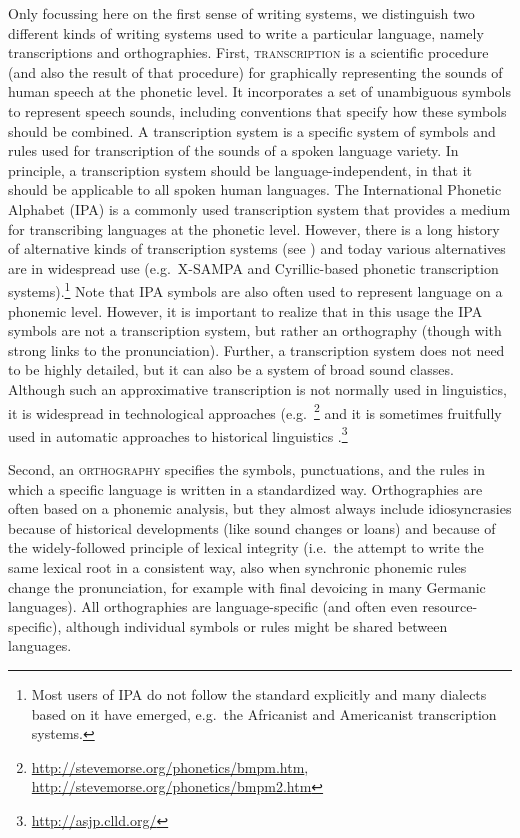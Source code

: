 Only focussing here on the first sense of writing systems, we distinguish two different kinds of writing systems used to write a particular language, namely transcriptions and orthographies. First, \textsc{transcription} is a scientific procedure (and also the result of that procedure) for graphically representing the sounds of human speech at the phonetic level. It incorporates a set of unambiguous symbols to represent speech sounds, including conventions that specify how these symbols should be combined. A transcription system is a specific system of symbols and rules used for transcription of the sounds of a spoken language variety. In principle, a transcription system should be language-independent, in that it should be applicable to all spoken human languages. The International Phonetic Alphabet (IPA) is a commonly used transcription system that provides a medium for transcribing languages at the phonetic level. However, there is a long history of alternative kinds of transcription systems (see \citet{Kemp1994}) and today various alternatives are in widespread use (e.g.~X-SAMPA and Cyrillic-based phonetic transcription systems).\footnote{Most users of IPA do not follow the standard explicitly and many dialects based on it have emerged, e.g.~the Africanist and Americanist transcription systems.} Note that IPA symbols are also often used to represent language on a phonemic level. However, it is important to realize that in this usage the IPA symbols are not a transcription system, but rather an orthography (though with strong links to the pronunciation). Further, a transcription system does not need to be highly detailed, but it can also be a system of broad sound classes. Although such an approximative transcription is not normally used in linguistics, it is widespread in technological approaches (e.g.~\citet{SoundexBeiderMorse2010}\footnote{\url{http://stevemorse.org/phonetics/bmpm.htm}, \url{http://stevemorse.org/phonetics/bmpm2.htm}} and it is sometimes fruitfully used in automatic approaches to historical linguistics \citep{Dolgopolsky1986,ASJP16}.\footnote{\url{http://asjp.clld.org/}}

Second, an \textsc{orthography} specifies the symbols, punctuations, and the rules in which a specific language is written in a standardized way. Orthographies are often based on a phonemic analysis, but they almost always include idiosyncrasies because of historical developments (like sound changes or loans) and because of the widely-followed principle of lexical integrity (i.e.~the attempt to write the same lexical root in a consistent way, also when synchronic phonemic rules change the pronunciation, for example with final devoicing in many Germanic languages). All orthographies are language-specific (and often even resource-specific), although individual symbols or rules might be shared between languages. 

